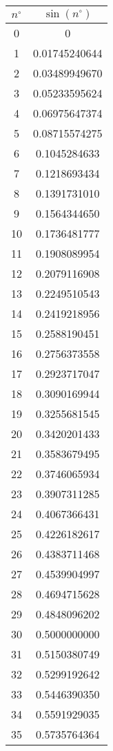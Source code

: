 \documentclass[12pt]{article}
\begin{document}
\begin{tabular}{||c|c||}
\hline\hline
$n^\circ$ & $\sin(n^\circ)$\\
\hline\hline
0 & 0 \\\hline
 1 & 0.01745240644 \\\hline
 2 & 0.03489949670 \\\hline
 3 & 0.05233595624 \\\hline

4 & 0.06975647374 \\\hline
 5 & 0.08715574275 \\\hline
 6 & 0.1045284633 \\\hline
 7 &
   0.1218693434 \\\hline
 8 & 0.1391731010 \\\hline
 9 & 0.1564344650 \\\hline
 10 &
0.1736481777 \\\hline
 11 & 0.1908089954 \\\hline
 12 & 0.2079116908 \\\hline
 13 & 0.2249510543
\\\hline
 14 &
   0.2419218956 \\\hline
 15 & 0.2588190451 \\\hline
 16 & 0.2756373558 \\\hline
 17 &
0.2923717047 \\\hline
 18 & 0.3090169944 \\\hline
 19 & 0.3255681545 \\\hline
 20 & 0.3420201433
\\\hline
 21 &
   0.3583679495 \\\hline
 22 & 0.3746065934 \\\hline
 23 & 0.3907311285 \\\hline
 24 &
0.4067366431 \\\hline
 25 & 0.4226182617 \\\hline
 26 & 0.4383711468 \\\hline
 27 & 0.4539904997
\\\hline
 28 &
   0.4694715628 \\\hline
 29 & 0.4848096202 \\\hline
 30 & 0.5000000000 \\\hline
 31 &
0.5150380749 \\\hline
 32 & 0.5299192642 \\\hline
 33 & 0.5446390350 \\\hline
 34 & 0.5591929035
\\\hline
 35 &
   0.5735764364 \\\hline

\end{tabular}
\end{document}
